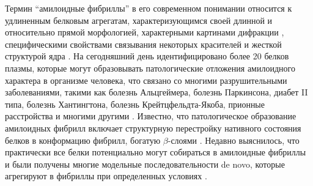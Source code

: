     Термин ``амилоидные фибриллы'' в его современном понимании относится к удлиненным белковым агрегатам, характеризующимся своей длинной и относительно прямой морфологией, характерными картинами дифракции \cite{sunde_common_1997}, специфическими свойствами связывания некоторых красителей и жесткой структурой ядра \cite{kumar_mechanisms_2010}. На сегодняшний день идентифицировано более 20 белков плазмы, которые могут образовывать патологические отложения амилоидного характера в организме человека, что связано со многими разрушительными заболеваниями, такими как болезнь Альцгеймера, болезнь Паркинсона, диабет II типа, болезнь Хантингтона, болезнь Крейтцфельдта-Якоба, прионные расстройства и многими другими \cite{chiti_protein_2006,makin_structures_2005,rochet_amyloid_2000}. Известно, что патологическое образование амилоидных фибрилл включает структурную перестройку нативного состояния белков в конформацию фибрилл, богатую $\beta$-слоями \cite{sipe_beta-pleated_2008}. Недавно выяснилось, что практически все белки потенциально могут собираться в амилоидные фибриллы \cite{chiti_protein_2006,chiti_designing_1999} и были получены многие модельные последовательности de novo, которые агрегируют в фибриллы при определенных условиях \cite{janek_water-soluble_1999}.

